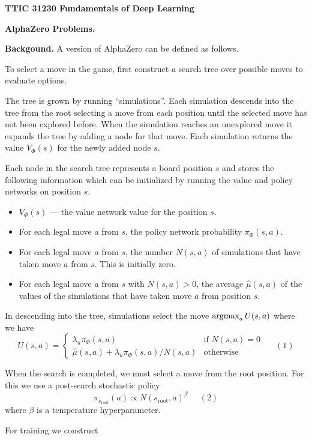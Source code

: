 \documentclass{article}
\begin{document}
\centerline{\bf TTIC 31230 Fundamentals of Deep Learning}
\bigskip
\centerline{\bf AlphaZero Problems.}

\bigskip
\bigskip
{\bf Backgound.}
A version of AlphaZero can be defined as follows.

\medskip
To select a move in the game, first construct a search tree over possible moves to evaluate options.

\medskip
The tree is grown by running ``simulations''.  Each simulation descends into the tree from the root selecting a move from each position
until the selected move has not been explored before.  When the simulation reaches an unexplored move it expands the tree by adding a node for that move.
Each simulation returns the value $V_\Phi(s)$ for the newly added node $s$.

\medskip
Each node in the search tree represents a board position $s$ and stores the following information which can be initialized
by running the value and policy networks on position $s$.

\begin{itemize}
\item $V_\Phi(s)$ --- the value network value for the position $s$.
\item For each legal move $a$ from $s$, the policy network probability $\pi_\Phi(s,a)$.
\item For each legal move $a$ from $s$, the number $N(s,a)$ of simulations that have taken move $a$ from $s$. This is initially zero.
\item For each legal move $a$ from $s$ with $N(s,a) > 0$, the average $\hat{\mu}(s,a)$ of the values of the simulations that have
  taken move $a$ from position $s$.
\end{itemize}

\medskip
In descending into the tree, simulations select the move $\operatorname*{argmax}_a U(s,a)$ where we have
$$U(s,a) =  \left\{\begin{array}{ll}\lambda_u \pi_\Phi(s,a) &\mbox{if $N(s,a) = 0$} \\ \hat{\mu}(s,a) + \lambda_u \pi_\Phi(s,a)/N(s,a) & \mbox{otherwise} \end{array}\right.\;\;\;\;\;(1)$$

\medskip
When the search is completed, we must select a move from the root position.  For this we use a post-search stochastic policy
$$\pi_{s_{\mathrm{root}}}(a) \propto N(s_{\mathrm{root}},a)^\beta\;\;\;\;\;(2)$$
where $\beta$ is a temperature hyperparameter.

\medskip
For training we construct
\end{document}
